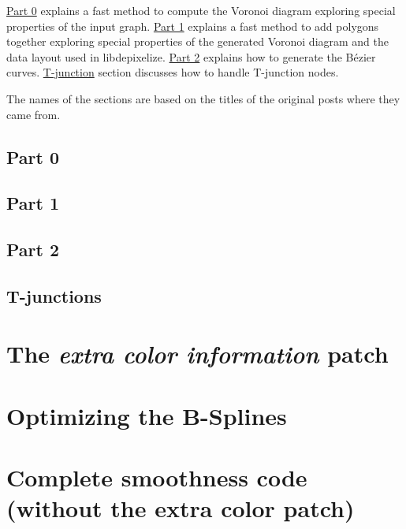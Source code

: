 \documentclass{report}
\begin{document}
\hyperref[blogpart0]{Part 0} explains a fast method to compute the Voronoi
diagram exploring special properties of the input graph.
\hyperref[blogpart1]{Part 1} explains a fast method to add polygons together
exploring special properties of the generated Voronoi diagram and the data
layout used in libdepixelize. \hyperref[blogpart2]{Part 2} explains how to
generate the Bézier curves. \hyperref[tjunction]{T-junction} section discusses
how to handle T-junction nodes.

The names of the sections are based on the titles of the original posts where
they came from.

\section{Part 0}
\label{blogpart0}


\section{Part 1}
\label{blogpart1}


\section{Part 2}
\label{blogpart2}


\section{T-junctions}
\label{tjunction}


\chapter{The \emph{extra color information} patch}
\label{extracolor}


\chapter{Optimizing the B-Splines}
\label{optimizing}


\appendix
\chapter{Complete smoothness code (without the extra color
  patch)}
\label{smoothness_code_appendix}

\end{document}
